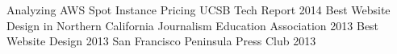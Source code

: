 \begin{cvhonors}
  \cvhonor
    {Analyzing AWS Spot Instance Pricing}
    {UCSB Tech Report}
    {}
    {2014}
  \cvhonor
    {Best Website Design in Northern California}
    {Journalism Education Association}
    {}
    {2013}
  \cvhonor
    {Best Website Design 2013}
    {San Francisco Peninsula Press Club}
    {}
    {2013}
\end{cvhonors}
